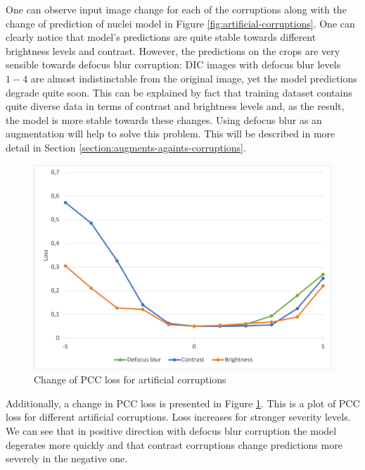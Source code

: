 One can observe input image change for each of the corruptions along with the change of prediction of nuclei model in Figure \ref{fig:artificial-corruptions}. One can clearly notice that model's predictions are quite stable towards different brightness levels and contrast. However, the predictions on the crops are very sensible towards defocus blur corruption: DIC images with defocus blur levels $1-4$ are almost indistinctable from the original image, yet the model predictions degrade quite soon. This can be explained by fact that training dataset contains quite diverse data in terms of contrast and brightness levels and, as the result, the model is more stable towards these changes. Using defocus blur as an augmentation will help to solve this problem. This will be described in more detail in Section \ref{section:augments-againts-corruptions}.
\begin{figure}[H]
	\begin{center}
		\includegraphics[width=0.8\linewidth]{bilder/corruptions-loss.png}
		\caption{Change of PCC loss for artificial corruptions}\label{fig:corruptions-loss}
	\end{center}
\end{figure}

Additionally, a change in PCC loss is presented in Figure \ref{fig:corruptions-loss}. This is a plot of PCC loss for different artificial corruptions. Loss increases for stronger severity levels. We can see that in positive direction with defocus blur corruption the model degerates more quickly and that contrast corruptions change predictions more severely in the negative one.
